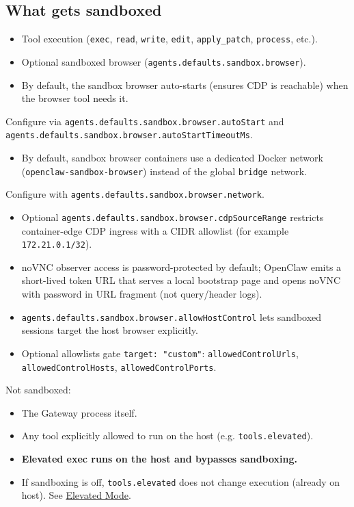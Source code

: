 \subsection{What gets sandboxed}


\begin{itemize}
  \item Tool execution (\texttt{exec}, \texttt{read}, \texttt{write}, \texttt{edit}, \texttt{apply\_patch}, \texttt{process}, etc.).
  \item Optional sandboxed browser (\texttt{agents.defaults.sandbox.browser}).
  \item By default, the sandbox browser auto-starts (ensures CDP is reachable) when the browser tool needs it.
\end{itemize}

Configure via \texttt{agents.defaults.sandbox.browser.autoStart} and \texttt{agents.defaults.sandbox.browser.autoStartTimeoutMs}.
\begin{itemize}
  \item By default, sandbox browser containers use a dedicated Docker network (\texttt{openclaw-sandbox-browser}) instead of the global \texttt{bridge} network.
\end{itemize}

Configure with \texttt{agents.defaults.sandbox.browser.network}.
\begin{itemize}
  \item Optional \texttt{agents.defaults.sandbox.browser.cdpSourceRange} restricts container-edge CDP ingress with a CIDR allowlist (for example \texttt{172.21.0.1/32}).
  \item noVNC observer access is password-protected by default; OpenClaw emits a short-lived token URL that serves a local bootstrap page and opens noVNC with password in URL fragment (not query/header logs).
  \item \texttt{agents.defaults.sandbox.browser.allowHostControl} lets sandboxed sessions target the host browser explicitly.
  \item Optional allowlists gate \texttt{target: "custom"}: \texttt{allowedControlUrls}, \texttt{allowedControlHosts}, \texttt{allowedControlPorts}.
\end{itemize}


Not sandboxed:

\begin{itemize}
  \item The Gateway process itself.
  \item Any tool explicitly allowed to run on the host (e.g. \texttt{tools.elevated}).
  \item \textbf{Elevated exec runs on the host and bypasses sandboxing.}
  \item If sandboxing is off, \texttt{tools.elevated} does not change execution (already on host). See \href{/tools/elevated}{Elevated Mode}.
\end{itemize}


